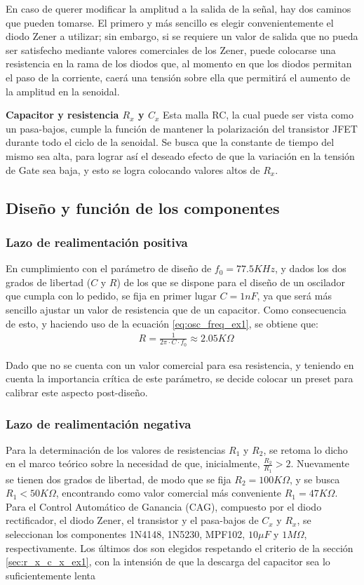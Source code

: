 En caso de querer modificar la amplitud a la salida de la señal, hay dos caminos que pueden tomarse.
El primero y más sencillo es elegir convenientemente el diodo Zener a utilizar; sin embargo, si se requiere un valor de salida que no pueda ser satisfecho 
mediante valores comerciales de los Zener, puede colocarse una resistencia en la rama de los diodos que, al momento en que los diodos permitan el paso de 
la corriente, caerá una tensión sobre ella que permitirá el aumento de la amplitud en la senoidal.
\newline

\textbf{Capacitor y resistencia $R_x$ y $C_x$} \label{sec:r_x_c_x_ex1}
Esta malla RC, la cual puede ser vista como un pasa-bajos, cumple la función de mantener la polarización del transistor JFET durante todo el ciclo de la 
senoidal.
Se busca que la constante de tiempo del mismo sea alta, para lograr así el deseado efecto de que la variación en la tensión de Gate sea baja, y esto se 
logra colocando valores altos de $R_x$.



\subsection{Diseño y función de los componentes}
\subsubsection{Lazo de realimentación positiva}
En cumplimiento con el parámetro de diseño de $f_0 = 77.5KHz$, y dados los dos grados de libertad ($C$ y $R$) de los que se dispone para el diseño de un 
oscilador que cumpla con lo pedido, se fija en primer lugar $C = 1nF$, ya que será más sencillo ajustar un valor de resistencia que de un capacitor.
Como consecuencia de esto, y haciendo uso de la ecuación \ref{eq:osc_freq_ex1}, se obtiene que:
\begin{align*}
    & R = \frac{1}{2\pi \cdot C \cdot f_0} \approx 2.05K\Omega
\end{align*}

Dado que no se cuenta con un valor comercial para esa resistencia, y teniendo en cuenta la importancia crítica de este parámetro, se decide colocar un 
preset para calibrar este aspecto post-diseño.


\subsubsection{Lazo de realimentación negativa}
Para la determinación de los valores de resistencias $R_1$ y $R_2$, se retoma lo dicho en el marco teórico sobre la necesidad de que, inicialmente, 
$\frac{R_2}{R_1} > 2$.
Nuevamente se tienen dos grados de libertad, de modo que se fija $R_2 = 100K\Omega$, y se busca $R_1 < 50K\Omega$, encontrando como valor comercial más 
conveniente $R_1 = 47K\Omega$.
Para el Control Automático de Ganancia (CAG), compuesto por el diodo rectificador, el diodo Zener, el transistor y el pasa-bajos de $C_x$ y $R_x$, 
se seleccionan los componentes 1N4148, 1N5230, MPF102, $10\mu F$ y $1M\Omega$, respectivamente.
Los últimos dos son elegidos respetando el criterio de la sección \ref{sec:r_x_c_x_ex1}, con la intensión de que la descarga del capacitor sea lo 
suficientemente lenta


